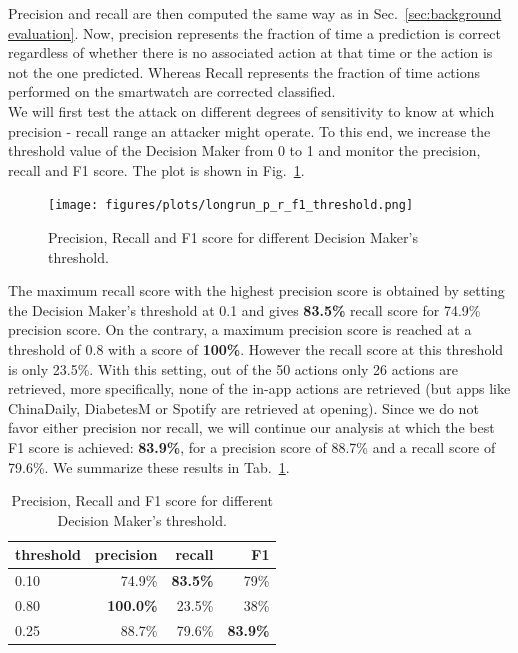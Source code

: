Precision and recall are then computed the same way as in Sec.~\ref{sec:background evaluation}. Now, precision represents the fraction of time a prediction is correct regardless of whether there is no associated action at that time or the action is not the one predicted. Whereas Recall represents the fraction of time actions performed on the smartwatch are corrected classified.
\\

We will first test the attack on different degrees of sensitivity to know at which precision - recall range an attacker might operate. To this end, we increase the threshold value of the Decision Maker from 0 to 1 and monitor the precision, recall and F1 score. The plot is shown in Fig.~\ref{fig:longrun_p_r_f1_threshold}. 





\begin{figure}[ht]
 \centering
 \texttt{[image: figures/plots/longrun\_p\_r\_f1\_threshold.png]}
 \caption{Precision, Recall and F1 score for different Decision Maker's threshold.}
  \label{fig:longrun_p_r_f1_threshold}
\end{figure}





 The maximum recall score with the highest precision score is obtained by setting the Decision Maker's threshold at 0.1 and gives \textbf{83.5\%} recall score for 74.9\% precision score. On the contrary, a maximum precision score is reached at a threshold of 0.8 with a score of \textbf{100\%}. However the recall score at this threshold is only 23.5\%. With this setting, out of the 50 actions only 26 actions are retrieved, more specifically, none of the in-app actions are retrieved (but apps like ChinaDaily, DiabetesM or Spotify are retrieved at opening). Since we do not favor either precision nor recall, we will continue our analysis at which the best F1 score is achieved: \textbf{83.9\%}, for a precision score of 88.7\% and a recall score of 79.6\%. We summarize these results in  Tab.~\ref{tab:p_r_f_thre}.
 \\
 
\begin{table}[ht]
\centering
\begin{tabular}{lrrr}
\toprule
threshold  &  precision&    recall &        F1 \\
\midrule
0.10      &         74.9\% &  \textbf{83.5\%} &  79\% \\
0.80      &         \textbf{100.0\%} &  23.5\% &  38\% \\
0.25      &         88.7\% &  79.6\% &  \textbf{83.9\%} \\
\bottomrule
\end{tabular}
\caption{Precision, Recall and F1 score for different Decision Maker's threshold.}
\label{tab:p_r_f_thre}
\end{table}
\\
 
